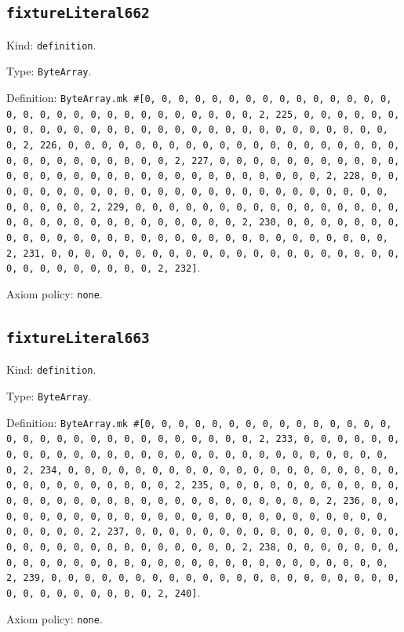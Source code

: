 \documentclass[11pt]{article}
\begin{document}
\subsection*{\texttt{fixtureLiteral662}}
\noindent Kind: \texttt{definition}.\par
\noindent Type: \texttt{ByteArray}.\par
\noindent Definition: \texttt{ByteArray.mk \#[0, 0, 0, 0, 0, 0, 0, 0, 0, 0, 0, 0, 0, 0, 0, 0, 0, 0, 0, 0, 0, 0, 0, 0, 0, 0, 0, 0, 0, 0, 2, 225, 0, 0, 0, 0, 0, 0, 0, 0, 0, 0, 0, 0, 0, 0, 0, 0, 0, 0, 0, 0, 0, 0, 0, 0, 0, 0, 0, 0, 0, 0, 2, 226, 0, 0, 0, 0, 0, 0, 0, 0, 0, 0, 0, 0, 0, 0, 0, 0, 0, 0, 0, 0, 0, 0, 0, 0, 0, 0, 0, 0, 0, 0, 2, 227, 0, 0, 0, 0, 0, 0, 0, 0, 0, 0, 0, 0, 0, 0, 0, 0, 0, 0, 0, 0, 0, 0, 0, 0, 0, 0, 0, 0, 0, 0, 2, 228, 0, 0, 0, 0, 0, 0, 0, 0, 0, 0, 0, 0, 0, 0, 0, 0, 0, 0, 0, 0, 0, 0, 0, 0, 0, 0, 0, 0, 0, 0, 2, 229, 0, 0, 0, 0, 0, 0, 0, 0, 0, 0, 0, 0, 0, 0, 0, 0, 0, 0, 0, 0, 0, 0, 0, 0, 0, 0, 0, 0, 0, 0, 2, 230, 0, 0, 0, 0, 0, 0, 0, 0, 0, 0, 0, 0, 0, 0, 0, 0, 0, 0, 0, 0, 0, 0, 0, 0, 0, 0, 0, 0, 0, 0, 2, 231, 0, 0, 0, 0, 0, 0, 0, 0, 0, 0, 0, 0, 0, 0, 0, 0, 0, 0, 0, 0, 0, 0, 0, 0, 0, 0, 0, 0, 0, 0, 2, 232]}.\par
\noindent Axiom policy: \texttt{none}.\par
\subsection*{\texttt{fixtureLiteral663}}
\noindent Kind: \texttt{definition}.\par
\noindent Type: \texttt{ByteArray}.\par
\noindent Definition: \texttt{ByteArray.mk \#[0, 0, 0, 0, 0, 0, 0, 0, 0, 0, 0, 0, 0, 0, 0, 0, 0, 0, 0, 0, 0, 0, 0, 0, 0, 0, 0, 0, 0, 0, 2, 233, 0, 0, 0, 0, 0, 0, 0, 0, 0, 0, 0, 0, 0, 0, 0, 0, 0, 0, 0, 0, 0, 0, 0, 0, 0, 0, 0, 0, 0, 0, 2, 234, 0, 0, 0, 0, 0, 0, 0, 0, 0, 0, 0, 0, 0, 0, 0, 0, 0, 0, 0, 0, 0, 0, 0, 0, 0, 0, 0, 0, 0, 0, 2, 235, 0, 0, 0, 0, 0, 0, 0, 0, 0, 0, 0, 0, 0, 0, 0, 0, 0, 0, 0, 0, 0, 0, 0, 0, 0, 0, 0, 0, 0, 0, 2, 236, 0, 0, 0, 0, 0, 0, 0, 0, 0, 0, 0, 0, 0, 0, 0, 0, 0, 0, 0, 0, 0, 0, 0, 0, 0, 0, 0, 0, 0, 0, 2, 237, 0, 0, 0, 0, 0, 0, 0, 0, 0, 0, 0, 0, 0, 0, 0, 0, 0, 0, 0, 0, 0, 0, 0, 0, 0, 0, 0, 0, 0, 0, 2, 238, 0, 0, 0, 0, 0, 0, 0, 0, 0, 0, 0, 0, 0, 0, 0, 0, 0, 0, 0, 0, 0, 0, 0, 0, 0, 0, 0, 0, 0, 0, 2, 239, 0, 0, 0, 0, 0, 0, 0, 0, 0, 0, 0, 0, 0, 0, 0, 0, 0, 0, 0, 0, 0, 0, 0, 0, 0, 0, 0, 0, 0, 0, 2, 240]}.\par
\noindent Axiom policy: \texttt{none}.\par
\end{document}
